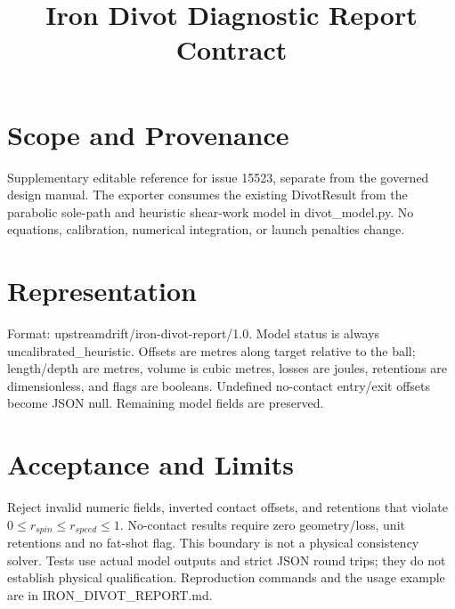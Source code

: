 \documentclass{article}
\title{Iron Divot Diagnostic Report Contract}
\date{}
\begin{document}
\maketitle
\section{Scope and Provenance}
Supplementary editable reference for issue 15523, separate from the governed
design manual. The exporter consumes the existing DivotResult from the
parabolic sole-path and heuristic shear-work model in divot\_model.py.
No equations, calibration, numerical integration, or launch penalties change.
\section{Representation}
Format: upstreamdrift/iron-divot-report/1.0. Model status is always
uncalibrated\_heuristic. Offsets are metres along target relative to the ball;
length/depth are metres, volume is cubic metres, losses are joules, retentions
are dimensionless, and flags are booleans. Undefined no-contact entry/exit
offsets become JSON null. Remaining model fields are preserved.
\section{Acceptance and Limits}
Reject invalid numeric fields, inverted contact offsets, and retentions that
violate $0 \leq r_{spin} \leq r_{speed} \leq 1$. No-contact results require
zero geometry/loss, unit retentions and no fat-shot flag. This boundary is
not a physical consistency solver. Tests use actual model outputs and
strict JSON round trips; they do not establish physical qualification.
Reproduction commands and the usage example are in IRON\_DIVOT\_REPORT.md.
\end{document}
